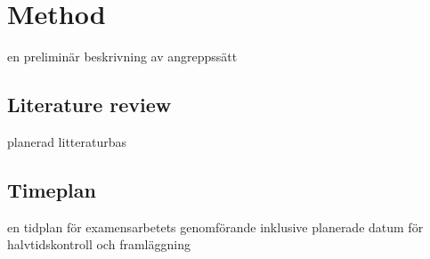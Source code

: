 \chapter{Method}\label{cha:metod}
en preliminär beskrivning av angreppssätt

\section{Literature review}
planerad litteraturbas

\citep{ButcherController:2015}

\citep{ButcherIdentification:2015}

\citep{Biggio:2014}

\citep{FlemingLeang:2014}


\section{Timeplan}
en tidplan för examensarbetets genomförande inklusive planerade datum för halvtidskontroll och framläggning
